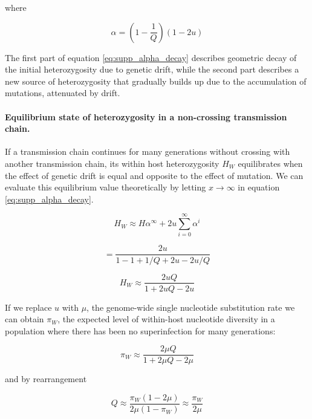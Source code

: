 \documentclass[_main.tex]{subfiles}
\begin{document}
where 

\begin{equation}
\alpha = (1 - \frac{1}{Q}) (1 - 2u) 
\label{eq:supp_alpha}
\end{equation}

The first part of equation \ref{eq:supp_alpha_decay} describes geometric decay of the initial heterozygosity due to genetic drift, while the second part describes a new source of heterozygosity that gradually builds up due to the accumulation of mutations, attenuated by drift.  

\paragraph{Equilibrium state of heterozygosity in a non-crossing transmission chain.} If a transmission chain continues for many generations without crossing with another transmission chain, its within host heterozygosity $H_W$ equilibrates when the effect of genetic drift is equal and opposite to the effect of mutation.  We can evaluate this equilibrium value theoretically by letting $x \rightarrow \infty$ in equation \ref{eq:supp_alpha_decay}.  

\begin{equation*}
H_W \approx H \alpha^\infty + 2u \sum_{i=0}^{\infty} \alpha^i
\end{equation*}

\begin{equation*}
= \frac{2u}{1 - 1 + 1/Q + 2u - 2u/Q}
\end{equation*}

\begin{equation}
H_W \approx \frac{2uQ}{1 + 2uQ - 2u}
\label{eq:supp_Hew}
\end{equation}

If we replace $u$ with $\mu$, the genome-wide single nucleotide substitution rate we can obtain $\pi_W$, the expected level of within-host nucleotide diversity in a population where there has been no superinfection for many generations:

\begin{equation*}
\pi_W \approx \frac{2 \mu Q}{1 + 2 \mu Q - 2 \mu}
\end{equation*}

and by rearrangement

\begin{equation*}
Q \approx \frac{\pi_W (1-2\mu)}{2 \mu (1 - \pi_W)} \approx \frac{\pi_W}{2 \mu}
\end{equation*}
\end{document}
